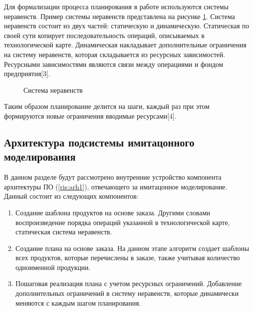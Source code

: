 Для формализации процесса планирования в работе используются системы неравенств. Пример системы неравенств представлена на рисунке \ref{ris:sys1}. Система неравенств состоит из двух частей: статическую и динамическую. Статическая по своей сути копирует последовательность операций, описываемых в технологической карте. Динамическая накладывает дополнительные ограничения на систему неравенств, которая складывается из ресурсных зависимостей. Ресурсными зависимостями являются связи между операциями и фондом предприятия[3].

\begin{figure}[H]
    \caption{Система неравенств}
    \label{ris:sys1}
\end{figure}

Таким образом планирование делится на шаги, каждый раз при этом формируются новые ограничения вводимые ресурсами[4].

\subsection{Архитектура подсистемы имитацонного моделирования}

В данном разделе будут рассмотрено внутренние устройство компонента архитектуры ПО (\ref{ris:arh1}), отвечающего за имитацонное моделирование. 
Данный состоит из следующих компонентов:

\begin{enumerate}
    \item Создание шаблона продуктов на основе заказа. Другими словами воспроизведение порядка операций указанной в технологической карте, статическая система неравенств.
    \item Создание плана на основе заказа. На данном этапе алгоритм создает шаблоны всех продуктов, которые перечислены в заказе, также учитывая количество одноименной продукции.
    \item Пошаговая реализация плана с учетом ресурсных ограничений. Добавление дополнительных ограничений в систему неравенств, которые динамически меняются с каждым шагом планирования.
\end{enumerate}

